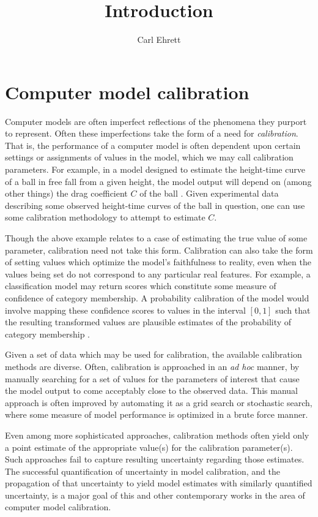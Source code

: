 \documentclass[10pt,a4paper]{article}
\author{Carl Ehrett}
\title{Introduction}
\begin{document}
	
\maketitle

\section{Computer model calibration}

Computer models are often imperfect reflections of the phenomena they purport to represent.
Often these imperfections take the form of a need for \textit{calibration}.
That is, the performance of a computer model is often dependent upon certain settings or assignments of values in the model, which we may call calibration parameters. %
For example, in a model designed to estimate the height-time curve of a ball in free fall from a given height, the model output will depend on (among other things) the drag coefficient $C$ of the ball \citep{Gattiker2017}.
Given experimental data describing some observed height-time curves of the ball in question, one can use some calibration methodology to attempt to estimate $C$.

Though the above example relates to a case of estimating the true value of some parameter, calibration need not take this form.
Calibration can also take the form of setting values which optimize the model's faithfulness to reality, even when the values being set do not correspond to any particular real features.
For example, a classification model may return scores which constitute some measure of confidence of category membership.
A probability calibration of the model would involve mapping these confidence scores to values in the interval $[0,1]$ such that the resulting transformed values are plausible estimates of the probability of category membership \citep{Niculescu2005}.

Given a set of data which may be used for calibration, the available calibration methods are diverse. 
Often, calibration is approached in an \textit{ad hoc} manner, by manually searching for a set of values for the parameters of interest that cause the model output to come acceptably close to the observed data.
This manual approach is often improved by automating it as a grid search or stochastic search, where some measure of model performance is optimized in a brute force manner. %

Even among more sophisticated approaches, calibration methods often yield only a point estimate of the appropriate value(s) for the calibration parameter(s).
Such approaches fail to capture resulting uncertainty regarding those estimates.
The successful quantification of uncertainty in model calibration, and the propagation of that uncertainty to yield model estimates with similarly quantified uncertainty, is a major goal of this and other contemporary works in the area of computer model calibration.
\end{document}
